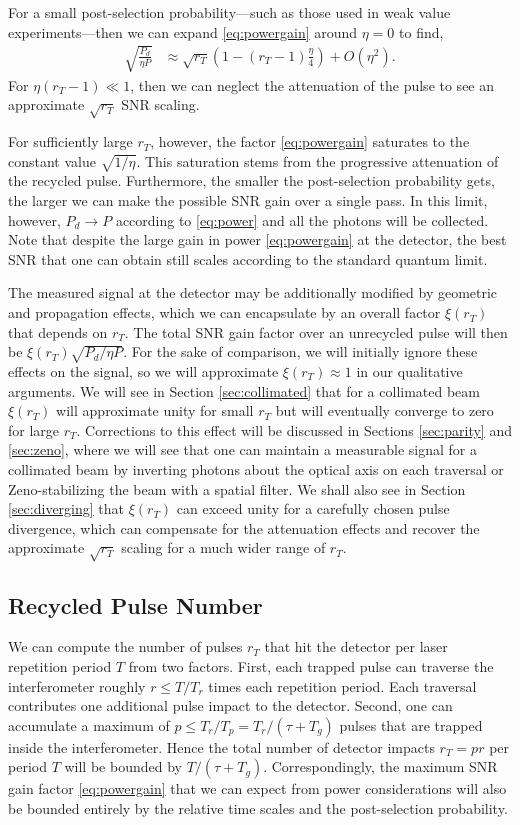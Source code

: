 For a small post-selection probability---such as those used in weak value experiments---then we can expand \eqref{eq:powergain} around $\eta = 0$ to find,
\begin{align}
  \sqrt{\frac{P_d}{\eta P}} &\approx \sqrt{r_T}\left(1 - (r_T-1) \frac{\eta}{4}\right) + O(\eta^2).
\end{align}
For $\eta (r_T-1) \ll 1$, then we can neglect the attenuation of the pulse to see an approximate $\sqrt{r_T}$ SNR scaling.

For sufficiently large $r_T$, however, the factor \eqref{eq:powergain} saturates to the constant value $\sqrt{1/\eta}$.  This saturation stems from the progressive attenuation of the recycled pulse.  Furthermore, the smaller the post-selection probability gets, the larger we can make the possible SNR gain over a single pass.  In this limit, however, $P_d \to P$ according to \eqref{eq:power} and all the photons will be collected.  Note that despite the large gain in power \eqref{eq:powergain} at the detector, the best SNR that one can obtain still scales according to the standard quantum limit.

The measured signal at the detector may be additionally modified by geometric and propagation effects, which we can encapsulate by an overall factor $\xi(r_T)$ that depends on $r_T$.  The total SNR gain factor over an unrecycled pulse will then be $\xi(r_T)\sqrt{P_d/\eta P}$.  For the sake of comparison, we will initially ignore these effects on the signal, so we will approximate $\xi(r_T) \approx 1$ in our qualitative arguments.  We will see in Section \ref{sec:collimated} that for a collimated beam $\xi(r_T)$ will approximate unity for small $r_T$ but will eventually converge to zero for large $r_T$.  Corrections to this effect will be discussed in Sections \ref{sec:parity} and \ref{sec:zeno}, where we will see that one can maintain a measurable signal for a collimated beam by inverting photons about the optical axis on each traversal or Zeno-stabilizing the beam with a spatial filter.  We shall also see in Section \ref{sec:diverging} that $\xi(r_T)$ can exceed unity for a carefully chosen pulse divergence, which can compensate for the attenuation effects and recover the approximate $\sqrt{r_T}$ scaling for a much wider range of $r_T$.

\subsection{Recycled Pulse Number}\label{sec:pulsenumber}
We can compute the number of pulses $r_T$ that hit the detector per laser repetition period $T$ from two factors.  First, each trapped pulse can traverse the interferometer roughly $r \le T / T_r$ times each repetition period.  Each traversal contributes one additional pulse impact to the detector.  Second, one can accumulate a maximum of $p \le T_r / T_p = T_r / (\tau + T_g)$ pulses that are trapped inside the interferometer.  Hence the total number of detector impacts $r_T = p r$ per period $T$ will be bounded by $T / (\tau + T_g)$.  Correspondingly, the maximum SNR gain factor \eqref{eq:powergain} that we can expect from power considerations will also be bounded entirely by the relative time scales and the post-selection probability.


